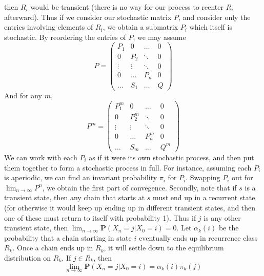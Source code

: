 \documentclass[12pt]{report}
\theoremstyle{plain}
\theoremstyle{definition}
\begin{document}
then $R_i$ would be transient (there is no way for our process to reenter $R_i$ afterward). Thus if we consider our stochastic matrix $P$, and consider only the entries involving elements of $R_i$, we obtain a submatrix $P_i$ which itself is stochastic. By reordering the entries of $P$, we may assume
%
\[ P = \begin{pmatrix} P_1 & 0 & \dots & 0 \\ 0 & P_2 & \ddots & 0 \\ \vdots & \vdots & \ddots & 0 \\ 0 & \dots & P_n & 0 \\ \dots & S_1 & \dots & Q \end{pmatrix} \]
%
And for any $m$,
%
\[ P^m = \begin{pmatrix} P_1^m & 0 & \dots & 0 \\ 0 & P_2^m & \ddots & 0 \\ \vdots & \vdots & \ddots & 0 \\ 0 & \dots & P_n^m & 0 \\ \dots & S_m & \dots & Q^m \end{pmatrix} \]
%
We can work with each $P_i$ as if it were its own stochastic process, and then put them together to form a stochastic process in full. For instance, assuming each $P_i$ is aperiodic, we can find an invariant probability $\pi_i$ for $P_i$. Swapping $P_i$ out for $\lim_{n \to \infty} P^n$, we obtain the first part of convegence. Secondly, note that if $s$ is a transient state, then any chain that starts at $s$ must end up in a recurrent state (for otherwise it would keep up ending up in different transient states, and then one of these must return to itself with probability 1). Thus if $j$ is any other transient state, then $\lim_{n \to \infty} \mathbf{P}(X_n = j | X_0 = i) = 0$. Let $\alpha_k(i)$ be the probability that a chain starting in state $i$ eventually ends up in recurrence class $R_k$. Once a chain ends up in $R_k$, it will settle down to the equilibrium distribution on $R_k$. If $j \in R_k$, then
%
\[ \lim_{n \to \infty} \mathbf{P}(X_n = j | X_0 = i) = \alpha_k(i)\pi_k(j) \]
\end{document}
